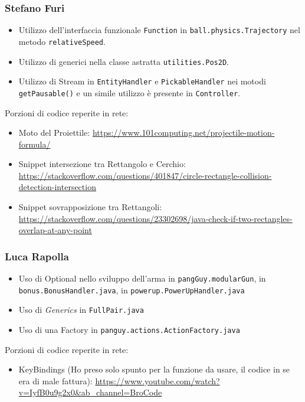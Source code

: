 \documentclass[a4paper,12pt]{report}
\begin{document}
\subsubsection{Stefano Furi}
\begin{itemize}
    \item Utilizzo dell'interfaccia funzionale \texttt{Function} in \texttt{ball.physics.Trajectory} nel metodo \texttt{relativeSpeed}.
    \item Utilizzo di generici nella classe astratta \texttt{utilities.Pos2D}.
    \item Utilizzo di Stream in \texttt{EntityHandler} e \texttt{PickableHandler} nei motodi \texttt{getPausable()} e un simile utilizzo è presente in \texttt{Controller}.
\end{itemize}
Porzioni di codice reperite in rete:
\begin{itemize}
    \item Moto del Proiettile:
    \url{https://www.101computing.net/projectile-motion-formula/}
    \item Snippet intersezione tra Rettangolo e Cerchio:  \url{https://stackoverflow.com/questions/401847/circle-rectangle-collision-detection-intersection}
    \item Snippet sovrapposizione tra Rettangoli:
    \url{https://stackoverflow.com/questions/23302698/java-check-if-two-rectangles-overlap-at-any-point}
\end{itemize}

\subsubsection{Luca Rapolla}
\begin{itemize}
    \item Uso di Optional nello sviluppo dell'arma in \texttt{pangGuy.modularGun}, in \texttt{bonus.BonusHandler.java}, in \texttt{powerup.PowerUpHandler.java}
    \item Uso di \emph{Generics} in \texttt{FullPair.java}
    \item Uso di una Factory in \texttt{panguy.actions.ActionFactory.java}
\end{itemize}

Porzioni di codice reperite in rete:
\begin{itemize}
    \item KeyBindings (Ho preso solo spunto per la funzione da usare, il codice in se era di male fattura): \url{https://www.youtube.com/watch?v=IyfB0u9g2x0&ab_channel=BroCode}
\end{itemize}
\end{document}
